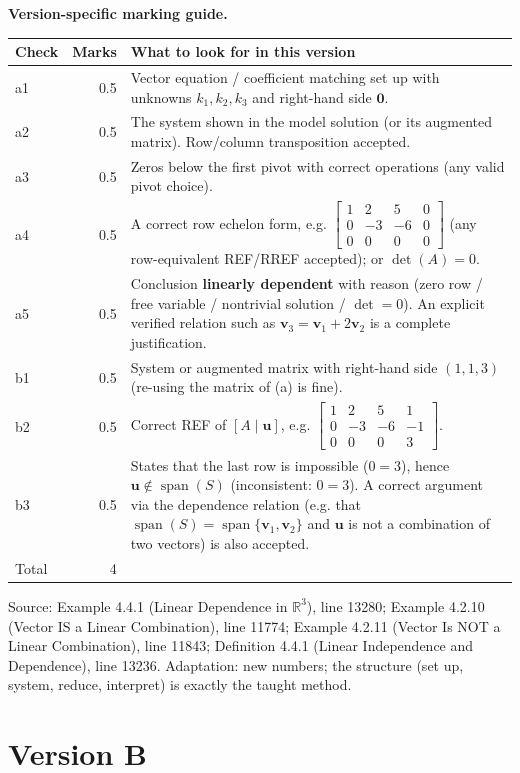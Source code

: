 \documentclass[11pt,a4paper]{article}
\newcommand{\Src}[1]{{\footnotesize\color{black!65}Source: #1}}
\begin{document}
\textbf{Version-specific marking guide.}\par
\begin{tabularx}{\linewidth}{@{}l r X@{}}\toprule Check & Marks & What to look for in this version\\\midrule
a1 & 0.5 & Vector equation / coefficient matching set up with unknowns $k_1,k_2,k_3$ and right-hand side $\mathbf{0}$.\\
a2 & 0.5 & The system shown in the model solution (or its augmented matrix). Row/column transposition accepted.\\
a3 & 0.5 & Zeros below the first pivot with correct operations (any valid pivot choice).\\
a4 & 0.5 & A correct row echelon form, e.g. $\left[\begin{array}{ccc|c} 1 & 2 & 5 & 0 \\ 0 & -3 & -6 & 0 \\ 0 & 0 & 0 & 0 \end{array}\right]$ (any row-equivalent REF/RREF accepted); or $\det(A)=0$.\\
a5 & 0.5 & Conclusion \textbf{linearly dependent} with reason (zero row / free variable / nontrivial solution / $\det=0$). An explicit verified relation such as $\mathbf{v}_3=\mathbf{v}_1+2\mathbf{v}_2$ is a complete justification.\\
b1 & 0.5 & System or augmented matrix with right-hand side $(1,1,3)$ (re-using the matrix of (a) is fine).\\
b2 & 0.5 & Correct REF of $[A\mid\mathbf{u}]$, e.g. $\left[\begin{array}{ccc|c} 1 & 2 & 5 & 1 \\ 0 & -3 & -6 & -1 \\ 0 & 0 & 0 & 3 \end{array}\right]$.\\
b3 & 0.5 & States that the last row is impossible ($0=3$), hence $\mathbf{u}\notin\operatorname{span}(S)$ (inconsistent: $0=3$). A correct argument via the dependence relation (e.g. that $\operatorname{span}(S)=\operatorname{span}\{\mathbf{v}_1,\mathbf{v}_2\}$ and $\mathbf{u}$ is not a combination of two vectors) is also accepted.\\
\midrule Total & 4 & \\\bottomrule\end{tabularx}
\Src{Example 4.4.1 (Linear Dependence in $\mathbb{R}^3$), line 13280; Example 4.2.10 (Vector IS a Linear Combination), line 11774; Example 4.2.11 (Vector Is NOT a Linear Combination), line 11843; Definition 4.4.1 (Linear Independence and Dependence), line 13236. Adaptation: new numbers; the structure (set up, system, reduce, interpret) is exactly the taught method.}\par
\clearpage\section*{Version B}
\end{document}
